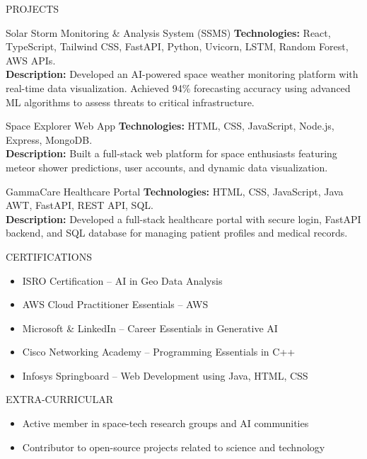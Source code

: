 \documentclass{resume}
\begin{document}
\vspace{-1.15em}
\begin{rSection}{PROJECTS}
\begin{rSubsection}{Solar Storm Monitoring \& Analysis System (SSMS)}{}{}
\textbf{Technologies:} React, TypeScript, Tailwind CSS, FastAPI, Python, Uvicorn, LSTM, Random Forest, AWS APIs.\\
\textbf{Description:} Developed an AI-powered space weather monitoring platform with real-time data visualization. Achieved 94\% forecasting accuracy using advanced ML algorithms to assess threats to critical infrastructure.
\end{rSubsection}
\vspace{-0.95em}
\begin{rSubsection}{Space Explorer Web App}{}{}
\textbf{Technologies:} HTML, CSS, JavaScript, Node.js, Express, MongoDB.\\
\textbf{Description:} Built a full-stack web platform for space enthusiasts featuring meteor shower predictions, user accounts, and dynamic data visualization.
\end{rSubsection}
\vspace{-0.95em}
\begin{rSubsection}{GammaCare Healthcare Portal}{}{}
\textbf{Technologies:} HTML, CSS, JavaScript, Java AWT, FastAPI, REST API, SQL.\\
\textbf{Description:} Developed a full-stack healthcare portal with secure login, FastAPI backend, and SQL database for managing patient profiles and medical records.
\end{rSubsection}
\end{rSection}
\vspace{-1.15em}
\begin{rSection}{CERTIFICATIONS}
\begin{itemize}
\item ISRO Certification – AI in Geo Data Analysis
\item AWS Cloud Practitioner Essentials – AWS
\item Microsoft \& LinkedIn – Career Essentials in Generative AI
\item Cisco Networking Academy – Programming Essentials in C++
\item Infosys Springboard – Web Development using Java, HTML, CSS
\end{itemize}
\end{rSection}
\vspace{-1.05em}
\begin{rSection}{EXTRA-CURRICULAR}
\begin{itemize}
\item Active member in space-tech research groups and AI communities
\item Contributor to open-source projects related to science and technology
\end{itemize}
\end{rSection}
\end{document}
